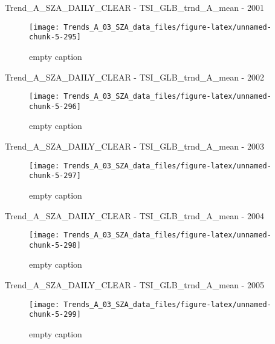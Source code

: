 \documentclass[
  10pt,
  a4paper,oneside]{article}
\begin{document}
Trend\_A\_SZA\_DAILY\_CLEAR - TSI\_GLB\_trnd\_A\_mean - 2001

\begin{figure}[!ht]

{\centering \texttt{[image: Trends\_A\_03\_SZA\_data\_files/figure-latex/unnamed-chunk-5-295]} 

}

\caption{ empty caption }\label{fig:unnamed-chunk-5-295}
\end{figure}

Trend\_A\_SZA\_DAILY\_CLEAR - TSI\_GLB\_trnd\_A\_mean - 2002

\begin{figure}[!ht]

{\centering \texttt{[image: Trends\_A\_03\_SZA\_data\_files/figure-latex/unnamed-chunk-5-296]} 

}

\caption{ empty caption }\label{fig:unnamed-chunk-5-296}
\end{figure}

Trend\_A\_SZA\_DAILY\_CLEAR - TSI\_GLB\_trnd\_A\_mean - 2003

\begin{figure}[!ht]

{\centering \texttt{[image: Trends\_A\_03\_SZA\_data\_files/figure-latex/unnamed-chunk-5-297]} 

}

\caption{ empty caption }\label{fig:unnamed-chunk-5-297}
\end{figure}

Trend\_A\_SZA\_DAILY\_CLEAR - TSI\_GLB\_trnd\_A\_mean - 2004

\begin{figure}[!ht]

{\centering \texttt{[image: Trends\_A\_03\_SZA\_data\_files/figure-latex/unnamed-chunk-5-298]} 

}

\caption{ empty caption }\label{fig:unnamed-chunk-5-298}
\end{figure}

Trend\_A\_SZA\_DAILY\_CLEAR - TSI\_GLB\_trnd\_A\_mean - 2005

\begin{figure}[!ht]

{\centering \texttt{[image: Trends\_A\_03\_SZA\_data\_files/figure-latex/unnamed-chunk-5-299]} 

}

\caption{ empty caption }\label{fig:unnamed-chunk-5-299}
\end{figure}
\end{document}
